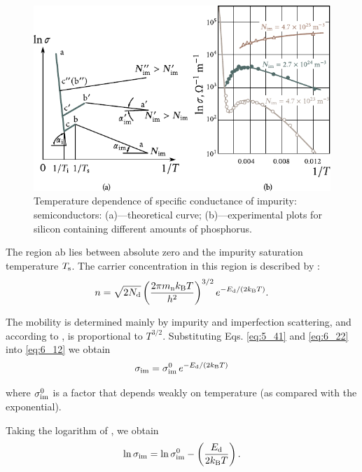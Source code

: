 \begin{figure}[t]
	\begin{center}
		\includegraphics[scale=1]{figures/ch_06/fig_6_14.pdf}
		\caption[]{Temperature dependence of specific conductance of impurity: semiconductors: (a)---theoretical curve; (b)---experimental plots for silicon containing different amounts of phosphorus.}
		\label{fig:6_14}
	\end{center}
	\vspace{-0.7cm}
\end{figure}

The region ab lies between absolute zero and the impurity saturation temperature $T_{\text{s}}$. The carrier concentration in this region is described by :
\begin{equation*}
	n = \sqrt{2 N_{\text{d}}} \left(\frac{2 \pi m_{\text{n}} k_{\text{B}} T}{h^2}\right)^{3/2} e^{-E_{\text{d}}/(2k_{\text{B}}T)}.
\end{equation*}

\noindent
The mobility is determined mainly by impurity and imperfection scattering, and according to , is proportional to $T^{3/2}$. Substituting Eqs. \eqref{eq:5_41} and \eqref{eq:6_22} into \eqref{eq:6_12} we obtain
\begin{equation}\label{eq:6_38}
	\sigma_{\text{im}} = \sigma_{\text{im}}^0\, e^{-E_{\text{d}}/(2k_{\text{B}}T)}
\end{equation}

\noindent
where $\sigma_{\text{im}}^0$ is a factor that depends weakly on temperature (as compared with the exponential).

Taking the logarithm of , we obtain
\begin{equation}\label{eq:6_39}
	\ln{\sigma_{\text{im}}} = \ln{\sigma_{\text{im}}^0} - \left(\frac{E_{\text{d}}}{2k_{\text{B}}T}\right).
\end{equation}

